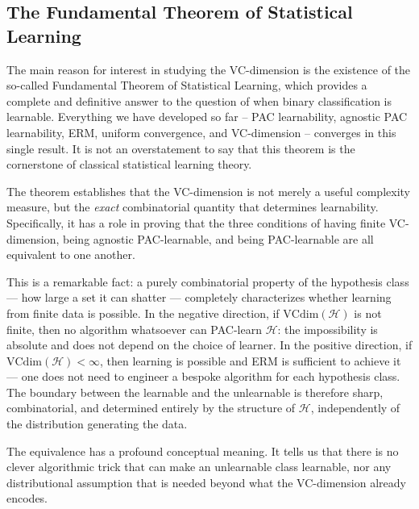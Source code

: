 \begin{itemize}
\end{itemize}


\subsection*{The Fundamental Theorem of Statistical Learning}

The main reason for interest in studying the VC-dimension is the existence of the so-called
\alert{Fundamental Theorem of Statistical Learning}, which provides a complete and definitive
answer to the question of when binary classification is learnable. Everything we have developed
so far -- PAC learnability, agnostic PAC learnability, ERM, uniform convergence, and
VC-dimension -- converges in this single result. It is not an overstatement to say that this
theorem is the cornerstone of classical statistical learning theory.

The theorem establishes that the VC-dimension is not merely a useful complexity measure, but
the \emph{exact} combinatorial quantity that determines learnability. Specifically, it has a role in proving
that the three conditions of having finite VC-dimension, being agnostic PAC-learnable, and
being PAC-learnable are all equivalent to one another. 

This is a remarkable fact: a purely combinatorial property of the hypothesis class --- how
large a set it can shatter --- completely characterizes whether learning from finite data is
possible. In the negative direction, if $\mathrm{VCdim}(\mathcal{H}) $ is not finite, then no
algorithm whatsoever can PAC-learn $\mathcal{H}$: the impossibility is absolute and does not
depend on the choice of learner. In the positive direction, if
$\mathrm{VCdim}(\mathcal{H}) < \infty$, then learning is possible and ERM is sufficient to
achieve it --- one does not need to engineer a bespoke algorithm for each hypothesis class.
The boundary between the learnable and the unlearnable is therefore sharp, combinatorial, and
determined entirely by the structure of $\mathcal{H}$, independently of the distribution
generating the data.

The equivalence has a profound conceptual meaning. It tells us that there is no clever
algorithmic trick that can make an unlearnable class learnable, nor any distributional
assumption that is needed beyond what the VC-dimension already encodes. 

